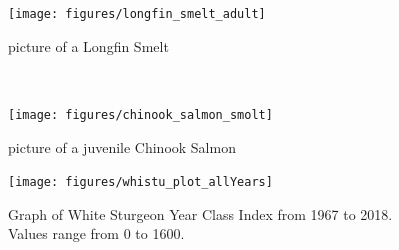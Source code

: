 \documentclass[
]{book}
\begin{document}
\begin{panel-grid}
\begin{columns-nocenter}
\begin{column40}
\end{column40}

\begin{column800}

\begin{figure}

{\centering \texttt{[image: figures/longfin\_smelt\_adult]} 

}

\caption{picture of a Longfin Smelt}\label{fig:unnamed-chunk-171}
\end{figure}

\end{column800}

\begin{column40}

~

\end{column40}

\begin{column800}

\begin{figure}

{\centering \texttt{[image: figures/chinook\_salmon\_smolt]} 

}

\caption{picture of a juvenile Chinook Salmon}\label{fig:unnamed-chunk-172}
\end{figure}

\end{column800}

\end{columns-nocenter}

\begin{columns-nocenter}

\begin{column800}

\begin{expand}

\begin{figure}
\texttt{[image: figures/whistu\_plot\_allYears]} \caption{Graph of White Sturgeon Year Class Index from 1967 to 2018. Values range from 0 to 1600.}\label{fig:unnamed-chunk-173}
\end{figure}

\end{expand}

\end{column800}

\begin{column40}

~


\end{column40}
\end{columns-nocenter}
\end{panel-grid}
\end{document}

